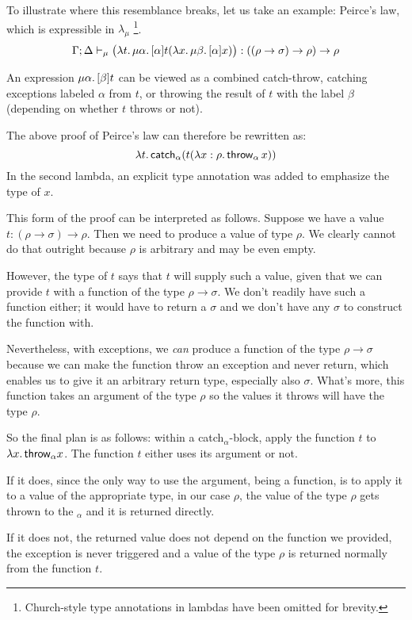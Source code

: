 To illustrate where this resemblance breaks, let us take an example: Peirce's law, which is
expressible in $\lambda_\mu$ \cite{krebbers11}\footnote{Church-style type annotations
in lambdas have been omitted for brevity.}.
\[ \Gamma; \Delta \vdash_\mu 
    \big(\lambda t.\, \mu \alpha.\, [\alpha] t (\lambda x.\, \mu \beta.\, [\alpha] x) \big)
      : ((\rho \to \sigma) \to \rho) \to \rho
\]

An expression $\mu \alpha.\,[\beta]t$ can be viewed as a combined catch-throw, catching
exceptions labeled $\alpha$ from $t$, or throwing the result of $t$ with the label $\beta$
(depending on whether $t$ throws or not).

The above proof of Peirce's law can therefore be rewritten as:
\[ \lambda t.\, \mathsf{catch}_\alpha (t (\lambda x : \rho.\, \mathsf{throw}_\alpha\, x)) \]
In the second lambda, an explicit type annotation was added to emphasize the type of $x$.

This form of the proof can be interpreted as follows. Suppose we have a value
$t : (\rho \to \sigma) \to \rho$. Then we need to produce a value of type $\rho$. We clearly
cannot do that outright because $\rho$ is arbitrary and may be even empty.

However, the type of $t$ says that $t$ will supply such a value, given that we can provide
$t$ with a function of the type $\rho \to \sigma$. We don't readily have such a function either;
it would have to return a $\sigma$ and we don't have any $\sigma$ to construct the function with.

Nevertheless, with exceptions, we \emph{can} produce a function of the type $\rho \to \sigma$
because we can make the function throw an exception and never return, which enables us
to give it an arbitrary return type, especially also $\sigma$. What's more, this function
takes an argument of the type $\rho$ so the values it throws will have the type $\rho$.

So the final plan is as follows: within a catch$_\alpha$-block, apply the function $t$ to
$\lambda x.\, \mathsf{throw}_\alpha x$. The function $t$ either uses its argument or not.

If it does, since
the only way to use the argument, being a function, is to apply it to a value of the
appropriate type, in our case $\rho$, the value of the type $\rho$ gets thrown to the
$_\alpha$ and it is returned directly.

If it does not, the returned value does not depend on the function we provided, the
exception is never triggered and a value of the type $\rho$ is returned normally from
the function $t$.

